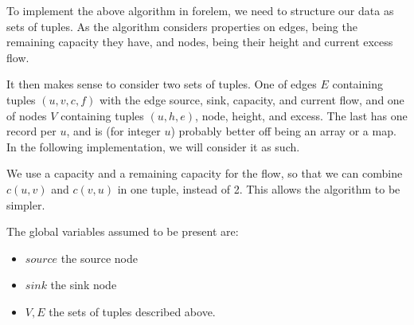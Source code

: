 To implement the above algorithm in forelem, we need to structure our data as sets of tuples. As the algorithm considers properties on edges, being the remaining capacity they have, and nodes, being their height and current excess flow.

It then makes sense to consider two sets of tuples. One of edges $E$ containing tuples $(u, v, c, f)$ with the edge source, sink, capacity, and current flow, and one of nodes $V$ containing tuples $(u, h, e)$, node, height, and excess. The last has one record per $u$, and is (for integer $u$) probably better off being an array or a map. In the following implementation, we will consider it as such.

We use a capacity and a remaining capacity for the flow, so that we can combine $c(u, v)$ and $c(v, u)$ in one tuple, instead of 2. This allows the algorithm to be simpler.

The global variables assumed to be present are:

\begin{itemize}
	\item $source$ the source node
	\item $sink$ the sink node
	\item $V, E$ the sets of tuples described above.
\end{itemize}

